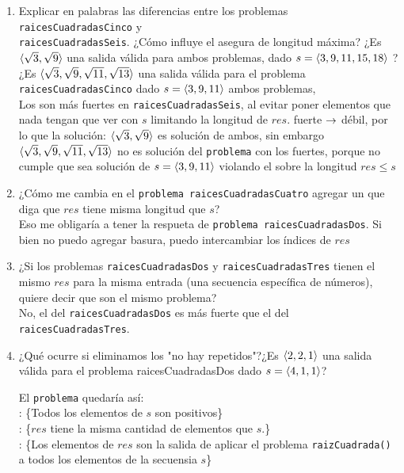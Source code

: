 \documentclass[12pt,a4paper,spanish]{article}
\begin{document}
\begin{enumerate}[label=\arabic*.]
	\item
	      Explicar en palabras las diferencias entre los problemas \texttt{raicesCuadradasCinco} y \\ \texttt{raicesCuadradasSeis}.
	      ¿Cómo influye el asegura de longitud máxima? ¿Es $\langle \sqrt{3}, \sqrt{9}\rangle$ una salida válida para ambos problemas,
	      dado $s = \langle 3, 9, 11, 15, 18\rangle$ ? ¿Es $\langle \sqrt{3}, \sqrt{9},\sqrt{11},\sqrt{13}\rangle$ una salida válida para el problema
	      \texttt{raicesCuadradasCinco} dado $s = \langle 3, 9, 11 \rangle$ ambos problemas,\\
	      \separadorCorto
	      Los \asegura son más fuertes en \texttt{raicesCuadradasSeis}, al evitar poner elementos que nada tengan que ver con $s$ limitando la longitud
	      de $res$. \asegura fuerte $\rightarrow$ \asegura débil, por lo que la solución:
	      $\langle\sqrt{3}, \sqrt{9}\rangle$ es solución de ambos, sin embargo $\langle\sqrt{3}, \sqrt{9},\sqrt{11},\sqrt{13}\rangle$ no es solución
	      del \texttt{problema} con los \asegura fuertes, porque no cumple que sea solución de $s = \langle 3, 9, 11 \rangle$ violando el \asegura
	      sobre la longitud $res \leq s$

	\item ¿Cómo me cambia en el \texttt{problema raicesCuadradasCuatro} agregar un \asegura que diga que $res$ tiene misma longitud que $s$? \\
	      \separadorCorto
	      Eso me  obligaría a tener la respueta de \texttt{problema raicesCuadradasDos}. Si bien no puedo agregar basura, puedo intercambiar los índices
	      de $res$

	\item ¿Si los problemas \texttt{raicesCuadradasDos} y \texttt{raicesCuadradasTres} tienen el mismo $res$ para la misma entrada (una secuencia
	      específica de números), quiere decir que son el mismo problema?\\
	      \separadorCorto
	      No, el \asegura del \texttt{raicesCuadradasDos} es más fuerte que el del \texttt{raicesCuadradasTres}.

	\item ¿Qué ocurre si eliminamos los \requiere "no hay repetidos"?¿Es $\langle 2, 2, 1 \rangle$ una salida válida
	      para el problema raicesCuadradasDos dado $s = \langle4, 1, 1\rangle$?\\

	      \separadorCorto

	      El \texttt{problema} quedaría así:\\
	      \requiere: \{Todos los elementos de $s$ son positivos\}\\
	      \asegura: \{$res$ tiene la misma cantidad de elementos que $s$.\}\\
	      \asegura: \{Los elementos de $res$ son la salida de aplicar el problema \texttt{raizCuadrada()} a todos los elementos de la secuensia $s$\}\\


\end{enumerate}
\end{document}
